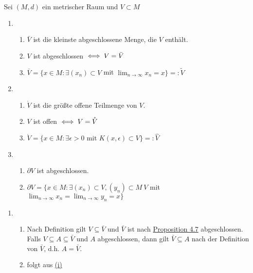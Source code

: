 \begin{prop} \label{prop:4.8}
	Sei $(M, d)$ ein metrischer Raum und $V \subset M$
	\begin{enumerate}[label=\alph*\upshape)]
		\item
			\begin{enumerate}
				\item \label{prop:4.8.a1} $\bar V$ ist die kleinste abgeschlossene Menge, die $V$ enthält.
				\item \label{prop:4.8.a2} $V$ ist abgeschlossen $\iff V = \bar V$
				\item \label{prop:4.8.a3} $\bar V = \{ x \in M: \exists (x_{n}) \subset V$ mit $\lim_{n \rightarrow \infty} x_{n} = x \} =: \tilde V$
			\end{enumerate} 
		\item 
			\begin{enumerate}
				\item \label{prop:4.8.b1} $\mathring V$ ist die grö{\ss}te offene Teilmenge von $V$.
				\item \label{prop:4.8.b2} $V$ ist offen $\iff V = \mathring V$
				\item \label{prop:4.8.b3} $\mathring V = \{ x \in M: \exists \epsilon > 0$ mit $K(x, \epsilon) \subset V \} =: \hat V$
			\end{enumerate} 
		\item
			\begin{enumerate}
				\item \label{prop:4.8.c1} $\partial V$ ist abgeschlossen.
				\item \label{prop:4.8.c2} $\partial V = \{ x \in M: \exists (x_{n}) \subset V, (y_{n}) \subset M \ V$ mit $ \lim_{n \rightarrow \infty} x_{n} = \lim_{n \rightarrow \infty} y_{n} = x \}$
			\end{enumerate} 
	\end{enumerate}	
	\begin{beweis}
		\begin{enumerate}[label=\alph*\upshape)]
			\item
				\begin{enumerate}
					\item \label{prop:4.8.a1-proof} Nach Definition gilt $V \subseteq \bar V$ und $\bar V$ ist nach \hyperref[prop:4.8]{Proposition 4.7} abgeschlossen. \\
						Falls $V \subseteq A \subseteq \bar V$ und $A$ abgeschlossen, dann gilt $\bar V \subseteq A$ nach der Definition von $\bar V$, d.h. $A = \bar V$.
					\item folgt aus \hyperref[prop:4.8.a1]{(i)}

\end{enumerate}
\end{enumerate}
\end{beweis}
\end{prop}
